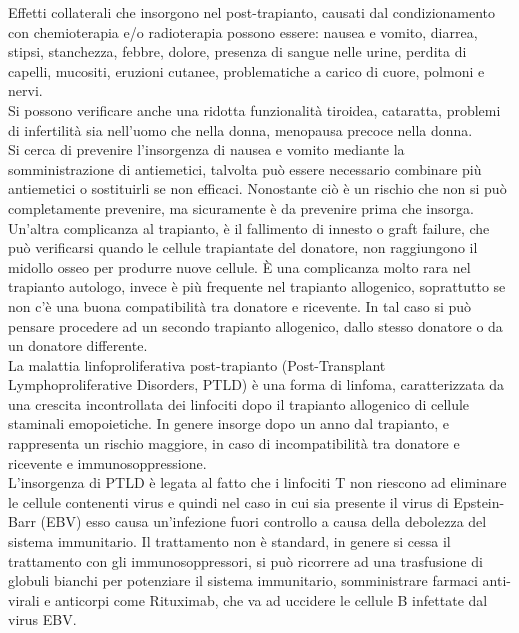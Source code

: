 Effetti collaterali che insorgono nel post-trapianto, causati dal condizionamento con chemioterapia e/o radioterapia 
possono essere: nausea e vomito, diarrea, stipsi, stanchezza, febbre, dolore, presenza di sangue nelle urine, 
perdita di capelli, mucositi, eruzioni cutanee, problematiche a carico di cuore, polmoni e nervi\cite{LLSBLOOD}.\\
Si possono verificare anche una ridotta funzionalità tiroidea, cataratta, problemi di infertilità sia nell’uomo 
che nella donna, menopausa precoce nella donna.\\
Si cerca di prevenire l’insorgenza di nausea e vomito mediante la somministrazione di antiemetici, talvolta 
può essere necessario combinare più antiemetici o sostituirli se non efficaci. 
Nonostante ciò è un rischio che non si può completamente prevenire, ma sicuramente è da prevenire prima che insorga\cite{STEMCELLS}.\\

Un’altra complicanza al trapianto, è il fallimento di innesto o graft failure, che può verificarsi quando le cellule 
trapiantate del donatore, non raggiungono il midollo osseo per produrre nuove cellule. È una complicanza molto rara 
nel trapianto autologo, invece è più frequente nel trapianto allogenico, soprattutto se non c’è una buona 
compatibilità tra donatore e ricevente. In tal caso si può pensare procedere ad un secondo trapianto allogenico, 
dallo stesso donatore o da un donatore differente\cite{LLSBLOOD}.\\

La malattia linfoproliferativa post-trapianto (Post-Transplant Lymphoproliferative Disorders, PTLD) è una forma di 
linfoma, caratterizzata da una crescita incontrollata dei linfociti dopo il trapianto allogenico di cellule staminali 
emopoietiche. In genere insorge dopo un anno dal trapianto, e rappresenta un rischio maggiore, in caso di incompatibilità 
tra donatore e ricevente e immunosoppressione.\\
L’insorgenza di PTLD è legata al fatto che i linfociti T non riescono ad eliminare le cellule contenenti 
virus e quindi nel caso in cui sia presente il virus di Epstein-Barr (EBV) esso causa un’infezione fuori controllo 
a causa della debolezza del sistema immunitario. Il trattamento non è standard, in genere si cessa il trattamento 
con gli immunosoppressori, si può ricorrere ad una trasfusione di globuli bianchi per potenziare il sistema 
immunitario, somministrare farmaci anti-virali e anticorpi come Rituximab, che va ad uccidere le cellule B infettate 
dal virus EBV\cite{STEMCELLS}.

